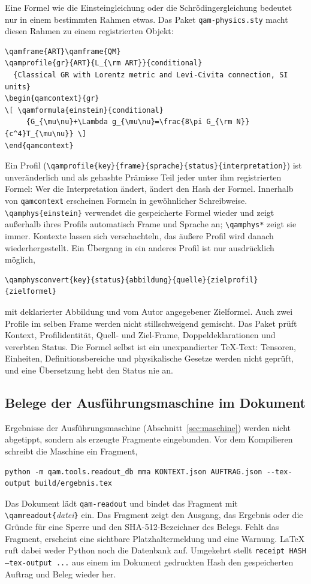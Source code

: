 Eine Formel wie die Einsteingleichung oder die Schrödingergleichung bedeutet nur in einem bestimmten Rahmen etwas. Das Paket
\texttt{qam-physics.sty} macht diesen Rahmen zu einem registrierten Objekt:
\begin{lstlisting}
\qamframe{ART}\qamframe{QM}
\qamprofile{gr}{ART}{L_{\rm ART}}{conditional}
  {Classical GR with Lorentz metric and Levi-Civita connection, SI units}
\begin{qamcontext}{gr}
\[ \qamformula{einstein}{conditional}
     {G_{\mu\nu}+\Lambda g_{\mu\nu}=\frac{8\pi G_{\rm N}}{c^4}T_{\mu\nu}} \]
\end{qamcontext}
\end{lstlisting}
Ein Profil (\verb|\qamprofile{key}{frame}{sprache}{status}{interpretation}|) ist unveränderlich und als gehashte Prämisse Teil jeder unter ihm
registrierten Formel: Wer die Interpretation ändert, ändert den Hash der Formel. Innerhalb von \verb|qamcontext| erscheinen Formeln in
gewöhnlicher Schreibweise. \verb|\qamphys{einstein}| verwendet die gespeicherte Formel wieder und zeigt außerhalb ihres Profils
automatisch Frame und Sprache an; \verb|\qamphys*| zeigt sie immer. Kontexte lassen sich verschachteln, das äußere Profil wird danach
wiederhergestellt. Ein Übergang in ein anderes Profil ist nur ausdrücklich möglich,
\begin{lstlisting}
\qamphysconvert{key}{status}{abbildung}{quelle}{zielprofil}{zielformel}
\end{lstlisting}
mit deklarierter Abbildung und vom Autor angegebener Zielformel. Auch zwei Profile im selben Frame werden nicht stillschweigend
gemischt. Das Paket prüft Kontext, Profilidentität, Quell- und Ziel-Frame, Doppeldeklarationen und vererbten Status. Die Formel selbst
ist ein unexpandierter \TeX-Text: Tensoren, Einheiten, Definitionsbereiche und physikalische Gesetze werden nicht geprüft, und eine
Übersetzung hebt den Status nie an.

\subsection{Belege der Ausführungsmaschine im Dokument}

Ergebnisse der Ausführungsmaschine (Abschnitt~\ref{sec:maschine}) werden nicht abgetippt, sondern als erzeugte Fragmente eingebunden.
Vor dem Kompilieren schreibt die Maschine ein Fragment,
\begin{lstlisting}
python -m qam.tools.readout_db mma KONTEXT.json AUFTRAG.json --tex-output build/ergebnis.tex
\end{lstlisting}
Das Dokument lädt \verb|qam-readout| und bindet das Fragment mit \verb|\qamreadout{|\textit{datei}\verb|}| ein. Das Fragment zeigt den
Ausgang, das Ergebnis oder die Gründe für eine Sperre und den SHA-512-Bezeichner des Belegs. Fehlt das Fragment, erscheint eine
sichtbare Platzhaltermeldung und eine Warnung. \LaTeX{} ruft dabei weder Python noch die Datenbank auf. Umgekehrt stellt
\texttt{receipt HASH --tex-output ...} aus einem im Dokument gedruckten Hash den gespeicherten Auftrag und Beleg wieder her.

